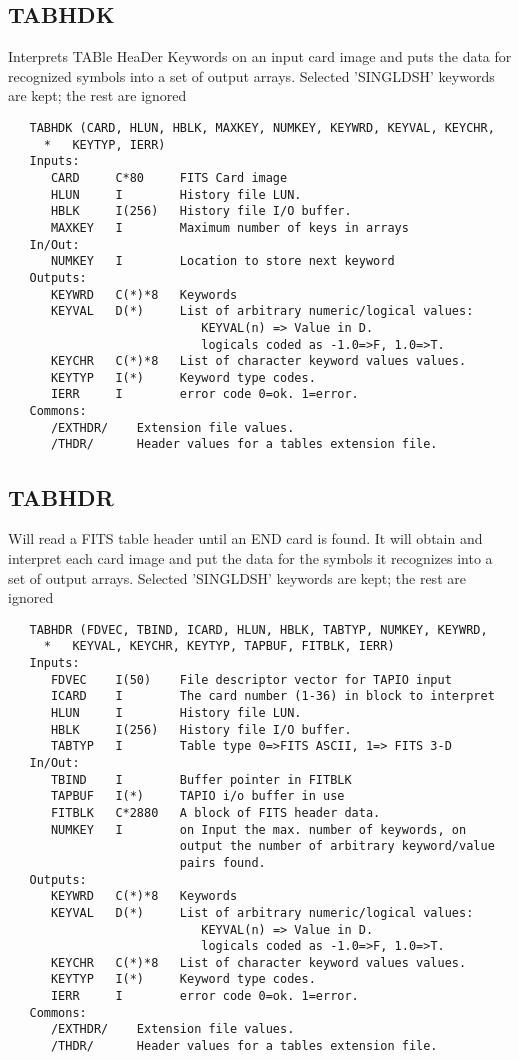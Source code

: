 \subsection{TABHDK}
Interprets TABle HeaDer Keywords on an input card image and
puts the data for recognized symbols into a set of output arrays.
Selected 'SINGLDSH' keywords are kept; the rest are ignored
\begin{verbatim}
   TABHDK (CARD, HLUN, HBLK, MAXKEY, NUMKEY, KEYWRD, KEYVAL, KEYCHR,
     *   KEYTYP, IERR)
   Inputs:
      CARD     C*80     FITS Card image
      HLUN     I        History file LUN.
      HBLK     I(256)   History file I/O buffer.
      MAXKEY   I        Maximum number of keys in arrays
   In/Out:
      NUMKEY   I        Location to store next keyword
   Outputs:
      KEYWRD   C(*)*8   Keywords
      KEYVAL   D(*)     List of arbitrary numeric/logical values:
                           KEYVAL(n) => Value in D.
                           logicals coded as -1.0=>F, 1.0=>T.
      KEYCHR   C(*)*8   List of character keyword values values.
      KEYTYP   I(*)     Keyword type codes.
      IERR     I        error code 0=ok. 1=error.
   Commons:
      /EXTHDR/    Extension file values.
      /THDR/      Header values for a tables extension file.
\end{verbatim}

\subsection{TABHDR}
Will read a FITS table header until an END card is found.
It will obtain and interpret each card image and put the data
for the symbols it recognizes into a set of output arrays.
Selected 'SINGLDSH' keywords are kept; the rest are ignored
\begin{verbatim}
   TABHDR (FDVEC, TBIND, ICARD, HLUN, HBLK, TABTYP, NUMKEY, KEYWRD,
     *   KEYVAL, KEYCHR, KEYTYP, TAPBUF, FITBLK, IERR)
   Inputs:
      FDVEC    I(50)    File descriptor vector for TAPIO input
      ICARD    I        The card number (1-36) in block to interpret
      HLUN     I        History file LUN.
      HBLK     I(256)   History file I/O buffer.
      TABTYP   I        Table type 0=>FITS ASCII, 1=> FITS 3-D
   In/Out:
      TBIND    I        Buffer pointer in FITBLK
      TAPBUF   I(*)     TAPIO i/o buffer in use
      FITBLK   C*2880   A block of FITS header data.
      NUMKEY   I        on Input the max. number of keywords, on
                        output the number of arbitrary keyword/value
                        pairs found.
   Outputs:
      KEYWRD   C(*)*8   Keywords
      KEYVAL   D(*)     List of arbitrary numeric/logical values:
                           KEYVAL(n) => Value in D.
                           logicals coded as -1.0=>F, 1.0=>T.
      KEYCHR   C(*)*8   List of character keyword values values.
      KEYTYP   I(*)     Keyword type codes.
      IERR     I        error code 0=ok. 1=error.
   Commons:
      /EXTHDR/    Extension file values.
      /THDR/      Header values for a tables extension file.
\end{verbatim}


